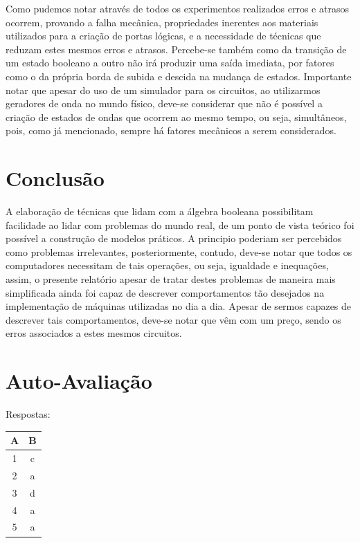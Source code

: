 \documentclass[12pt]{article}
\begin{document}
Como pudemos notar através de todos os experimentos realizados erros e atrasos
ocorrem, provando a falha mecânica, propriedades inerentes aos materiais
utilizados para a criação de portas lógicas, e a necessidade de técnicas que
reduzam estes mesmos erros e atrasos. Percebe-se também como da transição de um
estado booleano a outro não irá produzir uma saída imediata, por fatores como o
da própria borda de subida e descida na mudança de estados. Importante notar que
apesar do uso de um simulador para os circuitos, ao utilizarmos geradores de
onda no mundo físico, deve-se considerar que não é possível a criação de estados
de ondas que ocorrem ao mesmo tempo, ou seja, simultâneos, pois, como já
mencionado, sempre há fatores mecânicos a serem considerados.

\section{Conclusão}
\label{sec:Conclusao}

A elaboração de técnicas que lidam com a álgebra booleana possibilitam
facilidade ao lidar com problemas do mundo real, de um ponto de vista teórico
foi possível a construção de modelos práticos. A principio poderiam ser
percebidos como problemas irrelevantes, posteriormente, contudo, deve-se notar
que todos os computadores necessitam de tais operações, ou seja, igualdade e
inequações, assim, o presente relatório apesar de tratar destes problemas de
maneira mais simplificada ainda foi capaz de descrever comportamentos tão
desejados na implementação de máquinas utilizadas no dia a dia. Apesar de sermos
capazes de descrever tais comportamentos, deve-se notar que vêm com um preço,
sendo os erros associados a estes mesmos circuitos.

\nocite{*}



\newpage
\section*{Auto-Avaliação}

Respostas:
\begin{table}[H]
     \begin{tabular}{|c|c|} \hline
     \textbf{A} & \textbf{B}\\
     \hline
     1 & c \\ \hline
     2 & a \\ \hline
     3 & d \\ \hline
     4 & a \\ \hline
     5 & a \\ \hline
     \end{tabular}
\end{table}
\end{document}
